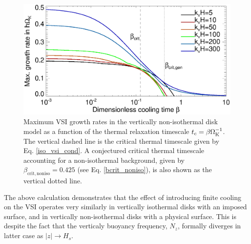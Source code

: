 \begin{figure}
  \includegraphics[scale=0.4415]{figures/gcorr_compare_vnoniso_maxrate2} 
  \caption{Maximum VSI growth rates in the vertically non-isothermal disk
    model as a function of the thermal relaxation timescale
    $t_c=\beta\Omega_{\rm K}^{-1}$. The vertical dashed line is the critical thermal
    timescale given by Eq. \ref{iso_vsi_cond}. A conjectured critical thermal
    timescale accounting for a non-isothermal background, given by 
     $\beta_\mathrm{crit,noniso}= 0.425$ (see Eq. \ref{bcrit_noniso}),   
    is also shown as the vertical dotted line. 
    \label{bcrit_compare2}}   
\end{figure} 

The above calculation demonstrates that the effect of introducing
finite cooling on the VSI operates very similarly in vertically
isothermal disks with an imposed surface, and in vertically
non-isothermal disks with a physical surface. This is despite the fact
that the verticaly buoyancy frequency, $N_z$, formally diverges in
latter case as $|z|\to H_s$.  



